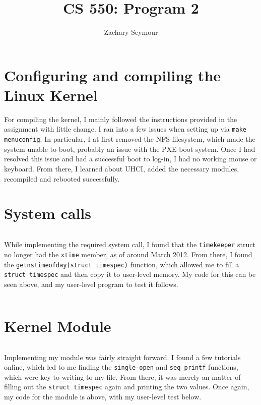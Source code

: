\documentclass[11pt]{article}
\title{CS 550: Program 2}
\author{Zachary Seymour}
\begin{document}
\maketitle

\section{Configuring and compiling the Linux Kernel}
\label{sec:conf-comp-linux}
For compiling the kernel, I mainly followed the instructions provided in the assignment with little change.
I ran into a few issues when setting up via \verb|make menuconfig|.
In particular, I at first removed the NFS filesystem, which made the system unable to boot, probably an issue with the PXE boot system.
Once I had resolved this issue and had a successful boot to log-in, I had no working mouse or keyboard.
From there, I learned about UHCI, added the necessary modules, recompiled and rebooted successfully.

\section{System calls}
\label{sec:system-calls}
\inputminted{c}{my_xtime.c}
While implementing the required system call, I found that the \verb|timekeeper| struct no longer had the \verb|xtime| member, as of around March 2012.
From there, I found the \verb|getnstimeofday(struct timespec)| function, which allowed me to fill a \verb|struct timespec| and then copy it to user-level memory.
My code for this can be seen above, and my user-level program to test it follows.
\inputminted{c}{/home/zach/irene/docs/latex-repo/CS_550/prog2/use_mycall.c}

\section{Kernel Module}
\label{sec:kernel-module}
\inputminted{c}{/home/zach/irene/docs/latex-repo/CS_550/prog2/module/xtime_proc.c}

Implementing my module was fairly straight forward.
I found a few tutorials online, which led to me finding the \verb|single-open| and \verb|seq_printf| functions, which were key to writing to my file.
From there, it was merely an matter of filling out the \verb|struct timespec| again and printing the two values.
Once again, my code for the module is above, with my user-level test below.
\inputminted{c}{/home/zach/irene/docs/latex-repo/CS_550/prog2/use_module.c}
\end{document}
